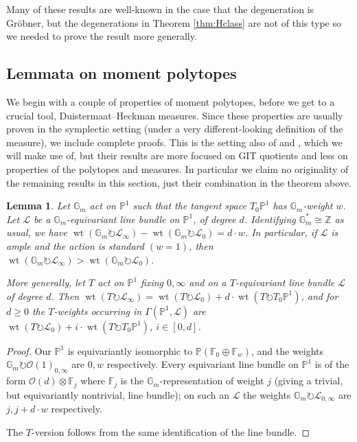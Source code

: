 \documentclass[11pt]{amsart}
\newtheorem{lemma}[Thm]{Lemma}
\theoremstyle{definition}
\DeclareMathOperator{\wt}{wt}
\newcommand{\ZZ}{\mathbb{Z}}
\newcommand{\PP}{\mathbb{P}}
\newcommand\FF{{\mathbb F}}
\newcommand\tensor\otimes
\newcommand\calO{{\mathcal O}}
\newcommand\calL{{\mathcal L}}
\newcommand\Gm{{\mathbb G}_m}
\newcommand\iso\cong
\newcommand\actson\circlearrowright
\begin{document}
Many of these results are well-known \cite{sturmfels1991grobner}
in the case that the degeneration is Gr\"obner, but the degenerations
in Theorem \ref{thm:Hclass} are not of this type so we needed to prove
the result more generally.

\subsection{Lemmata on moment polytopes}

We begin with a couple of properties of moment polytopes, before we get
to a crucial tool, Duistermaat--Heckman measures.
Since these properties are usually proven in the symplectic setting
(under a very different-looking definition of the measure), we include
complete proofs. This is the setting also of \cite{brion1990action}
and \cite{dolgachev1998variation}, which we will make use of,
but their results are more focused on GIT quotients and less on properties of
the polytopes and measures. In particular we claim no originality of
the remaining results in this section, just their combination in
the theorem above.

\begin{lemma}\label{lem:eqvtLineBundles}
  Let $\Gm$ act on $\PP^1$ such that the tangent space $T_0\PP^1$ has
  $\Gm$-weight $w$.
  Let $\calL$ be a $\Gm$-equivariant line bundle on $\PP^1$, of degree $d$.
  Identifying $\Gm^* \iso \ZZ$ as usual, we have
  $\wt(\Gm\actson \calL_\infty)-\wt(\Gm\actson \calL_0) = d\cdot w$.
  In particular, if $\calL$ is ample and the action is standard $(w=1)$,
  then $\wt(\Gm\actson \calL_\infty) > \wt(\Gm\actson \calL_0)$.

  More generally, let $T$ act on $\PP^1$ fixing $0,\infty$ and
  on a $T$-equivariant line bundle $\calL$ of degree $d$.
  Then 
  $\wt(T\actson \calL_\infty)
  = \wt(T\actson \calL_0) + d\cdot \wt(T\actson T_0 \PP^1)$, and for $d\geq 0$
  the $T$-weights occurring in $\Gamma(\PP^1, \calL)$ are
  $\wt(T\actson \calL_0) + i\cdot \wt(T\actson T_0 \PP^1)$, $i \in [0,d]$.
\end{lemma}

\begin{proof}
  Our $\PP^1$ is equivariantly isomorphic to $\PP(\FF_0\oplus \FF_w)$,
  and the weights $\Gm \actson \calO(1)_{0,\infty}$ are $0,w$ respectively.
  Every equivariant line bundle on $\PP^1$ is of the form
  $\calO(d) \tensor \FF_j$ where $\FF_j$ is the $\Gm$-representation
  of weight $j$ (giving a trivial, but equivariantly nontrivial, line bundle);
  on such an $\calL$ the weights $\Gm \actson \calL_{0,\infty}$
  are $j,j+d\cdot w$ respectively.

  The $T$-version follows from the same identification of the line bundle.
\end{proof}
\end{document}
